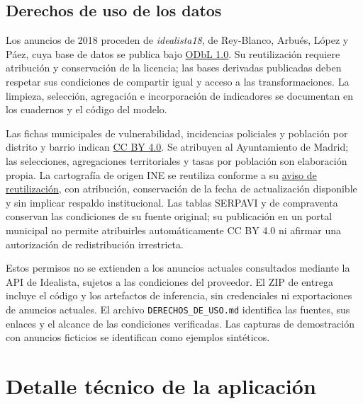 \documentclass[11pt,a4paper]{article}
\newcounter{anexo}
\newcounter{anexosub}[anexo]
\begin{document}
%
\subsection*{\theanexo\hspace{0.3em}\hspace{0.45em}Derechos de uso de los datos}

Los anuncios de 2018 proceden de \emph{idealista18}, de Rey-Blanco, Arbués, López y Páez, cuya base de datos se publica bajo \href{https://opendatacommons.org/licenses/odbl/1-0/}{ODbL 1.0}. Su reutilización requiere atribución y conservación de la licencia; las bases derivadas publicadas deben respetar sus condiciones de compartir igual y acceso a las transformaciones. La limpieza, selección, agregación e incorporación de indicadores se documentan en los cuadernos y el código del modelo.

Las fichas municipales de vulnerabilidad, incidencias policiales y población por distrito y barrio indican \href{https://creativecommons.org/licenses/by/4.0/deed.es}{CC BY 4.0}. Se atribuyen al Ayuntamiento de Madrid; las selecciones, agregaciones territoriales y tasas por población son elaboración propia. La cartografía de origen INE se reutiliza conforme a su \href{https://www.ine.es/ss/Satellite?L=0&c=Page&cid=1254735849170&p=1254735849170&pagename=Ayuda/INELayout}{aviso de reutilización}, con atribución, conservación de la fecha de actualización disponible y sin implicar respaldo institucional. Las tablas SERPAVI y de compraventa conservan las condiciones de su fuente original; su publicación en un portal municipal no permite atribuirles automáticamente CC BY 4.0 ni afirmar una autorización de redistribución irrestricta.

Estos permisos no se extienden a los anuncios actuales consultados mediante la API de Idealista, sujetos a las condiciones del proveedor. El ZIP de entrega incluye el código y los artefactos de inferencia, sin credenciales ni exportaciones de anuncios actuales. El archivo \texttt{DERECHOS\_DE\_USO.md} identifica las fuentes, sus enlaces y el alcance de las condiciones verificadas. Las capturas de demostración con anuncios ficticios se identifican como ejemplos sintéticos.

\clearpage{}\label{anx:\theanexo}%
\section*{\theanexo\hspace{0.6em}Detalle técnico de la aplicación}
\end{document}
